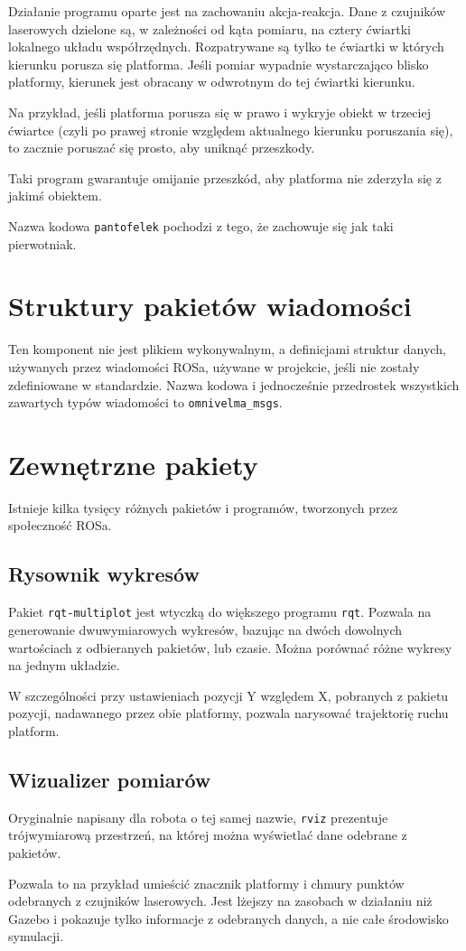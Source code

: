 	Działanie programu oparte jest na zachowaniu akcja-reakcja.
	Dane z czujników laserowych dzielone są, w zależności od kąta pomiaru, na cztery ćwiartki lokalnego układu współrzędnych.
	Rozpatrywane są tylko te ćwiartki w których kierunku porusza się platforma.
	Jeśli pomiar wypadnie wystarczająco blisko platformy, kierunek jest obracany w odwrotnym do tej ćwiartki kierunku.
	
	Na przykład, jeśli platforma porusza się w prawo i wykryje obiekt w trzeciej ćwiartce (czyli po prawej stronie względem aktualnego kierunku poruszania się),
	to zacznie poruszać się prosto, aby uniknąć przeszkody.
	
	Taki program gwarantuje omijanie przeszkód, aby platforma nie zderzyła się z jakimś obiektem.
	
	Nazwa kodowa \texttt{pantofelek} pochodzi z tego, że zachowuje się jak taki pierwotniak.
	
\section{Struktury pakietów wiadomości}
	Ten komponent nie jest plikiem wykonywalnym, a definicjami struktur danych, używanych przez wiadomości ROSa, używane w projekcie, jeśli nie zostały zdefiniowane w standardzie.
	Nazwa kodowa i jednocześnie przedrostek wszystkich zawartych typów wiadomości to \texttt{omnivelma\_msgs}.

\section{Zewnętrzne pakiety}
	Istnieje kilka tysięcy różnych pakietów i programów, tworzonych przez społeczność ROSa.
	
	\subsection{Rysownik wykresów}
		Pakiet \texttt{rqt-multiplot} jest wtyczką do większego programu \texttt{rqt}.
		Pozwala na generowanie dwuwymiarowych wykresów, bazując na dwóch dowolnych wartościach z odbieranych pakietów, lub czasie.
		Można porównać różne wykresy na jednym układzie.
		
		W szczególności przy ustawieniach pozycji Y względem X, pobranych z pakietu pozycji, nadawanego przez obie platformy, pozwala narysować trajektorię ruchu platform.
	\subsection{Wizualizer pomiarów}
		Oryginalnie napisany dla robota o tej samej nazwie, \texttt{rviz} prezentuje trójwymiarową przestrzeń, na której można wyświetlać 
		dane odebrane z pakietów.
		
		Pozwala to na przykład umieścić znacznik platformy i chmury punktów odebranych z czujników laserowych.
		Jest lżejszy na zasobach w działaniu niż Gazebo i pokazuje tylko informacje z odebranych danych, a nie całe środowisko symulacji.
		
		
	
	
	
	
	

